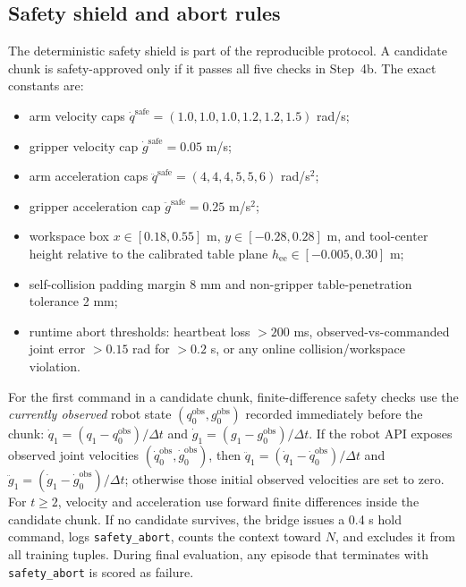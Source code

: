 \documentclass[10pt]{article}
\theoremstyle{plain}
\theoremstyle{definition}
\theoremstyle{remark}
\begin{document}
\subsection{Safety shield and abort rules}
The deterministic safety shield is part of the reproducible protocol. A candidate chunk is safety-approved only if it passes all five checks in Step~4b. The exact constants are:
\begin{itemize}
    \item arm velocity caps $\dot q^{\mathrm{safe}}=(1.0,1.0,1.0,1.2,1.2,1.5)$ rad/s;
    \item gripper velocity cap $\dot g^{\mathrm{safe}}=0.05$ m/s;
    \item arm acceleration caps $\ddot q^{\mathrm{safe}}=(4,4,4,5,5,6)$ rad/s$^2$;
    \item gripper acceleration cap $\ddot g^{\mathrm{safe}}=0.25$ m/s$^2$;
    \item workspace box $x\in[0.18,0.55]$ m, $y\in[-0.28,0.28]$ m, and tool-center height relative to the calibrated table plane $h_{\mathrm{ee}}\in[-0.005,0.30]$ m;
    \item self-collision padding margin 8 mm and non-gripper table-penetration tolerance 2 mm;
    \item runtime abort thresholds: heartbeat loss $>200$ ms, observed-vs-commanded joint error $>0.15$ rad for $>0.2$ s, or any online collision/workspace violation.
\end{itemize}
For the first command in a candidate chunk, finite-difference safety checks use the \emph{currently observed} robot state $(q^{\mathrm{obs}}_0,g^{\mathrm{obs}}_0)$ recorded immediately before the chunk: $\dot q_1=(q_1-q^{\mathrm{obs}}_0)/\Delta t$ and $\dot g_1=(g_1-g^{\mathrm{obs}}_0)/\Delta t$. If the robot API exposes observed joint velocities $(\dot q^{\mathrm{obs}}_0,\dot g^{\mathrm{obs}}_0)$, then $\ddot q_1=(\dot q_1-\dot q^{\mathrm{obs}}_0)/\Delta t$ and $\ddot g_1=(\dot g_1-\dot g^{\mathrm{obs}}_0)/\Delta t$; otherwise those initial observed velocities are set to zero. For $t\ge 2$, velocity and acceleration use forward finite differences inside the candidate chunk. If no candidate survives, the bridge issues a 0.4 s hold command, logs \texttt{safety\_abort}, counts the context toward $N$, and excludes it from all training tuples. During final evaluation, any episode that terminates with \texttt{safety\_abort} is scored as failure.
\end{document}

